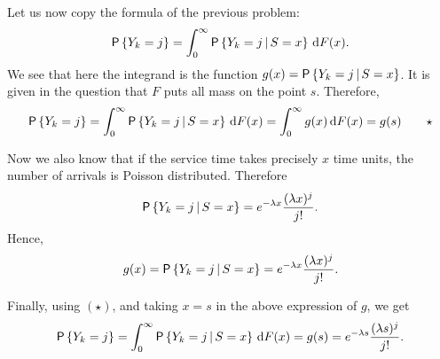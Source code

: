 \begin{question}
\begin{solution}
    Let us now copy the formula of the previous problem:
    \begin{equation*}
    \P{Y_k=j} = \int_0^\infty \P{Y_k =j\given S=x} \d F(x).
    \end{equation*}
    We see that here the integrand is the function
    $g(x) = \P{Y_k=j\given S=x}$. It is given in the question that $F$
    puts all mass on the point $s$. Therefore,
    \begin{equation*}
    \P{Y_k=j} = \int_0^\infty \P{Y_k =j\given S=x} \d F(x) = 
\int_0^\infty g(x) \d F(x) = g(s) \qquad \star
    \end{equation*}

    Now we also know that if the service time takes precisely $x$ time
    units, the number of arrivals is Poisson distributed. Therefore
    \begin{equation*}
    \P{Y_k =j\given S=x} = e^{-\lambda x}\frac{(\lambda x)^j}{j!}.
    \end{equation*}
Hence, 
    \begin{equation*}
    g(x) = \P{Y_k =j\given S=x} = e^{-\lambda x}\frac{(\lambda x)^j}{j!}.
    \end{equation*}


    Finally, using $(\star)$, and taking $x=s$ in the above expression of $g$, we get
    \begin{equation*}
    \P{Y_k=j} = \int_0^\infty \P{Y_k =j\given S=x} \d F(x) = 
    g(s) = e^{-\lambda s}\frac{(\lambda s)^j}{j!}.
    \end{equation*}


  \end{solution}
\end{question}

